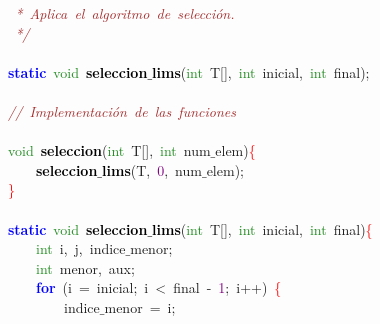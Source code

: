 \mbox{}\textit{\textcolor{Brown}{\ *\ Aplica\ el\ algoritmo\ de\ selección.}} \\
\mbox{}\textit{\textcolor{Brown}{\ */}} \\
\mbox{} \\
\mbox{}\textbf{\textcolor{Blue}{static}}\ \textcolor{ForestGreen}{void}\ \textbf{\textcolor{Black}{seleccion$\_$lims}}\textcolor{BrickRed}{(}\textcolor{ForestGreen}{int}\ T\textcolor{BrickRed}{[],}\ \textcolor{ForestGreen}{int}\ inicial\textcolor{BrickRed}{,}\ \textcolor{ForestGreen}{int}\ final\textcolor{BrickRed}{);} \\
\mbox{} \\
\mbox{}\textit{\textcolor{Brown}{//\ Implementación\ de\ las\ funciones}} \\
\mbox{} \\
\mbox{}\textcolor{ForestGreen}{void}\ \textbf{\textcolor{Black}{seleccion}}\textcolor{BrickRed}{(}\textcolor{ForestGreen}{int}\ T\textcolor{BrickRed}{[],}\ \textcolor{ForestGreen}{int}\ num$\_$elem\textcolor{BrickRed}{)}\textcolor{Red}{\{} \\
\mbox{}\ \ \ \ \textbf{\textcolor{Black}{seleccion$\_$lims}}\textcolor{BrickRed}{(}T\textcolor{BrickRed}{,}\ \textcolor{Purple}{0}\textcolor{BrickRed}{,}\ num$\_$elem\textcolor{BrickRed}{);} \\
\mbox{}\textcolor{Red}{\}} \\
\mbox{} \\
\mbox{}\textbf{\textcolor{Blue}{static}}\ \textcolor{ForestGreen}{void}\ \textbf{\textcolor{Black}{seleccion$\_$lims}}\textcolor{BrickRed}{(}\textcolor{ForestGreen}{int}\ T\textcolor{BrickRed}{[],}\ \textcolor{ForestGreen}{int}\ inicial\textcolor{BrickRed}{,}\ \textcolor{ForestGreen}{int}\ final\textcolor{BrickRed}{)}\textcolor{Red}{\{} \\
\mbox{}\ \ \ \ \textcolor{ForestGreen}{int}\ i\textcolor{BrickRed}{,}\ j\textcolor{BrickRed}{,}\ indice$\_$menor\textcolor{BrickRed}{;} \\
\mbox{}\ \ \ \ \textcolor{ForestGreen}{int}\ menor\textcolor{BrickRed}{,}\ aux\textcolor{BrickRed}{;} \\
\mbox{}\ \ \ \ \textbf{\textcolor{Blue}{for}}\ \textcolor{BrickRed}{(}i\ \textcolor{BrickRed}{=}\ inicial\textcolor{BrickRed}{;}\ i\ \textcolor{BrickRed}{\textless{}}\ final\ \textcolor{BrickRed}{-}\ \textcolor{Purple}{1}\textcolor{BrickRed}{;}\ i\textcolor{BrickRed}{++)}\ \textcolor{Red}{\{} \\
\mbox{}\ \ \ \ \ \ \ \ indice$\_$menor\ \textcolor{BrickRed}{=}\ i\textcolor{BrickRed}{;} \\

